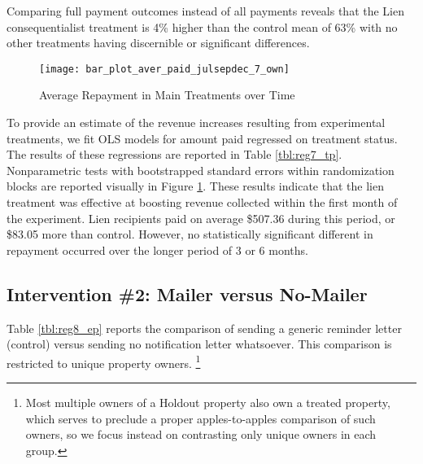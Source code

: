 \documentclass[12pt,titlepage]{article}
\begin{document}
Comparing full payment 
outcomes instead of all payments reveals that the Lien consequentialist 
treatment is 4\% higher than the control mean of 63\% with no other 
treatments having discernible or significant differences.

\begin{figure}[htpb]
\begin{center}
\caption{Average Repayment in Main Treatments over Time}
\label{fig:tp_time_7_own}
\bigskip
\texttt{[image: bar\_plot\_aver\_paid\_julsepdec\_7\_own]}
\end{center}
\end{figure}


To provide an estimate of the revenue increases resulting from experimental 
treatments, we fit OLS models for amount paid regressed on treatment status.
The results of these regressions are reported in 
Table \ref{tbl:reg7_tp}. Nonparametric tests with bootstrapped standard errors within 
randomization blocks are reported visually in Figure \ref{fig:tp_time_7_own}. 
These results indicate that the lien treatment was effective at boosting 
revenue collected within the first month of the experiment. Lien recipients 
paid on average \$507.36 during this period, or \$83.05 more than control. However, no statistically 
significant different in repayment occurred over the longer period of 3 or 6 months.


\subsection{Intervention \#2: Mailer versus No-Mailer}

Table \ref{tbl:reg8_ep} reports the comparison of sending a generic reminder letter 
(control) versus sending no notification letter whatsoever. This 
comparison is restricted to unique property owners.
\footnote{
	Most multiple owners of a Holdout property also own a treated property, which
	serves to preclude a proper apples-to-apples comparison of such owners, so
	we focus instead on contrasting only unique owners in each group.
}
\end{document}
